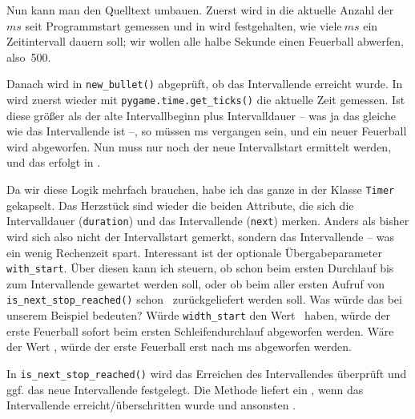 Nun kann man den Quelltext umbauen. Zuerst wird in  die aktuelle Anzahl der~$ms$ seit Programmstart gemessen und in  wird festgehalten, wie viele$~ms$ ein Zeitintervall dauern soll; wir wollen alle halbe Sekunde einen Feuerball abwerfen, also~500.


Danach wird in \texttt{new\_bullet()} abgeprüft, ob das Intervallende erreicht wurde. In  wird zuerst wieder mit \texttt{pygame.time.get\_ticks()} die aktuelle Zeit gemessen. Ist diese größer als der alte Intervallbeginn plus Intervalldauer -- was ja das gleiche wie das Intervallende ist --, so müssen \unit[500]{ms} vergangen sein, und ein neuer Feuerball wird abgeworfen. Nun muss nur noch der neue Intervallstart ermittelt werden, und das erfolgt in .


Da wir diese Logik mehrfach brauchen, habe ich das ganze in der Klasse \texttt{Timer} gekapselt. Das Herzstück sind wieder die beiden Attribute, die sich die Intervalldauer (\texttt{duration}) und das Intervallende (\texttt{next})  merken. Anders als bisher wird sich also nicht der Intervallstart gemerkt, sondern das Intervallende -- was ein wenig Rechenzeit spart. Interessant ist der optionale Übergabeparameter \texttt{with\_start}. Über diesen kann ich steuern, ob schon beim ersten Durchlauf bis zum Intervallende gewartet werden soll, oder ob beim aller ersten Aufruf von \texttt{is\_next\_stop\_reached()} schon \true\ zurückgeliefert werden soll. Was würde das bei unserem Beispiel bedeuten? Würde \texttt{width\_start} den Wert \true\ haben, würde der erste Feuerball sofort beim ersten Schleifendurchlauf abgeworfen werden. Wäre der Wert \false, würde der erste Feuerball erst nach \unit[500]{ms} abgeworfen werden.

In \texttt{is\_next\_stop\_reached()} wird das Erreichen des Intervallendes überprüft und ggf. das neue Intervallende festgelegt. Die Methode liefert ein \true, wenn das Intervallende erreicht/überschritten wurde und ansonsten \false.


